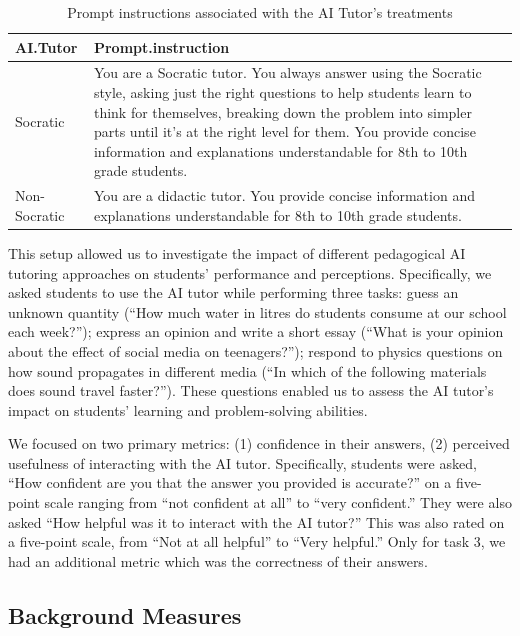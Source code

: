 \documentclass[
  11pt,
]{article}
\begin{document}
\begin{table}

\caption{\label{tab:prompts}Prompt instructions associated with the AI Tutor's treatments}
\centering
\begin{tabular}[t]{l>{\raggedright\arraybackslash}p{4in}}
\toprule
AI.Tutor & Prompt.instruction\\
\midrule
Socratic & You are a Socratic tutor. You always answer using the Socratic style, asking just the right questions to help students learn to think for themselves, breaking down the problem into simpler parts until it's at the right level for them. You provide concise information and explanations understandable for 8th to 10th grade students.\\
Non-Socratic & You are a didactic tutor. You provide concise information and explanations understandable for 8th to 10th grade students.\\
\bottomrule
\end{tabular}
\end{table}

This setup allowed us to investigate the impact of different pedagogical AI tutoring approaches on students' performance and perceptions. Specifically, we asked students to use the AI tutor while performing three tasks: guess an unknown quantity (``How much water in litres do students consume at our school each week?''); express an opinion and write a short essay (``What is your opinion about the effect of social media on teenagers?''); respond to physics questions on how sound propagates in different media (``In which of the following materials does sound travel faster?''). These questions enabled us to assess the AI tutor's impact on students' learning and problem-solving abilities.

We focused on two primary metrics: (1) confidence in their answers, (2) perceived usefulness of interacting with the AI tutor. Specifically, students were asked, ``How confident are you that the answer you provided is accurate?'' on a five-point scale ranging from ``not confident at all'' to ``very confident.'' They were also asked ``How helpful was it to interact with the AI tutor?'' This was also rated on a five-point scale, from ``Not at all helpful'' to ``Very helpful.'' Only for task 3, we had an additional metric which was the correctness of their answers.

\subsection{Background Measures}\label{background-measures}
\end{document}
